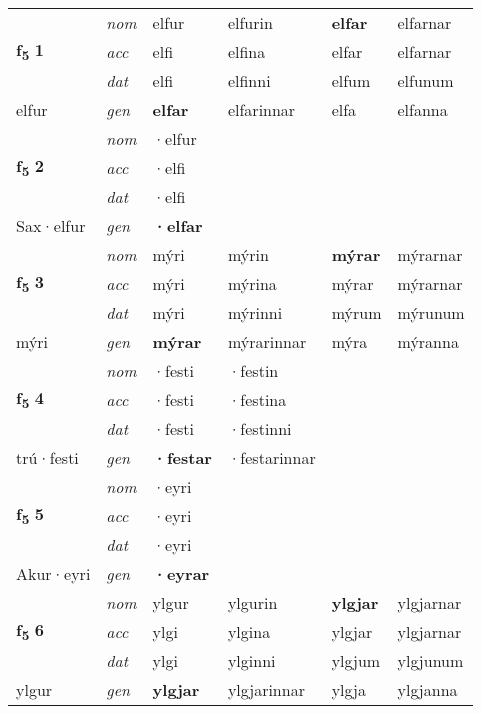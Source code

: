 \begin{longtable}[l]{X>{\footnotesize\itshape}XXXXX}
\multirow{3}{*}{{{\textbf{f{\textsubscript{5}}} \Large{\textbf{1}}}}} & nom & elfur & elfurin & \textbf{elfar} & elfarnar \\*
 & acc & elfi & elfina & elfar & elfarnar \\*
 & dat & elfi & elfinni & elfum & elfunum \\*
 {\footnotesize{elfur}} & gen & \textbf{elfar} & elfarinnar & elfa & elfanna \\


\multirow{3}{*}{{{\textbf{f{\textsubscript{5}}} \Large{\textbf{2}}}}} & nom & ·elfur &  & \textbf{} &  \\*
 & acc & ·elfi &  &  &  \\*
 & dat & ·elfi &  &  &  \\*
 {\footnotesize{Sax\allowbreak ·elfur}} & gen & \textbf{·elfar} &  &  &  \\
\cmidrule{1-6}

\multirow{3}{*}{{{\textbf{f{\textsubscript{5}}} \Large{\textbf{3}}}}} & nom & mýri & mýrin & \textbf{mýrar} & mýrarnar \\*
 & acc & mýri & mýrina & mýrar & mýrarnar \\*
 & dat & mýri & mýrinni & mýrum & mýrunum \\*
 {\footnotesize{mýri}} & gen & \textbf{mýrar} & mýrarinnar & mýra & mýranna \\
\cmidrule{1-6}

\multirow{3}{*}{{{\textbf{f{\textsubscript{5}}} \Large{\textbf{4}}}}} & nom & ·festi & ·festin & \textbf{} &  \\*
 & acc & ·festi & ·festina &  &  \\*
 & dat & ·festi & ·festinni &  &  \\*
 {\footnotesize{trú\allowbreak ·festi}} & gen & \textbf{·festar} & ·festarinnar &  &  \\
\cmidrule{1-6}

\multirow{3}{*}{{{\textbf{f{\textsubscript{5}}} \Large{\textbf{5}}}}} & nom & ·eyri &  & \textbf{} &  \\*
 & acc & ·eyri &  &  &  \\*
 & dat & ·eyri &  &  &  \\*
 {\footnotesize{Akur\allowbreak ·eyri}} & gen & \textbf{·eyrar} &  &  &  \\
\cmidrule{1-6}

\multirow{3}{*}{{{\textbf{f{\textsubscript{5}}} \Large{\textbf{6}}}}} & nom & ylgur & ylgurin & \textbf{ylgjar} & ylgjarnar \\*
 & acc & ylgi & ylgina & ylgjar & ylgjarnar \\*
 & dat & ylgi & ylginni & ylgjum & ylgjunum \\*
 {\footnotesize{ylgur}} & gen & \textbf{ylgjar} & ylgjarinnar & ylgja & ylgjanna \\
\cmidrule{1-6}


\end{longtable}
